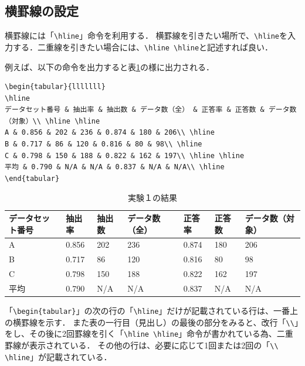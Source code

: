 \subsection{横罫線の設定}
横罫線には「\verb+\hline+」命令を利用する．
横罫線を引きたい場所で、\verb+\hline+を入力する．二重線を引きたい場合には、\verb+\hline \hline+と記述すれば良い．

例えば、以下の命令を出力すると表\ref{table:resultEx1b}の様に出力される．
\begin{breakbox}
{\small
\begin{verbatim}
\begin{tabular}{lllllll}
\hline
データセット番号 & 抽出率 & 抽出数 & データ数（全） & 正答率 & 正答数 & データ数（対象）\\ \hline \hline
A & 0.856 & 202 & 236 & 0.874 & 180 & 206\\ \hline
B & 0.717 & 86 & 120 & 0.816 & 80 & 98\\ \hline
C & 0.798 & 150 & 188 & 0.822 & 162 & 197\\ \hline \hline
平均 & 0.790 & N/A & N/A & 0.837 & N/A & N/A\\ \hline
\end{tabular}
\end{verbatim}
}
\end{breakbox}

\begin{table}[H]
\caption{実験１の結果}
\centering
\begin{tabular}{lllllll}
\hline
データセット番号 & 抽出率 & 抽出数 & データ数（全） & 正答率 & 正答数 & データ数（対象）\\ \hline \hline
A & 0.856 & 202 & 236 & 0.874 & 180 & 206\\ \hline
B & 0.717 & 86 & 120 & 0.816 & 80 & 98\\ \hline
C & 0.798 & 150 & 188 & 0.822 & 162 & 197\\ \hline \hline
平均 & 0.790 & N/A & N/A & 0.837 & N/A & N/A\\ \hline
\end{tabular}
\label{table:resultEx1b}
\end{table}

「\verb+\begin{tabular}+」の次の行の「\verb+\hline+」だけが記載されている行は、一番上の横罫線を示す．
また表の一行目（見出し）の最後の部分をみると、改行「\verb+\\+」をし、その後に2回罫線を引く「\verb+\hline \hline+」命令が書かれている為、二重罫線が表示されている．
その他の行は、必要に応じて1回または2回の「\verb+\\ \hline+」が記載されている．

